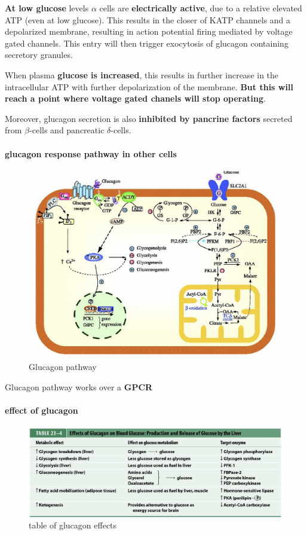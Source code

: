 \documentclass[../main.tex]{subfiles}
\begin{document}
\textbf{At low glucose} levels $\alpha$ cells are \textbf{electrically active}, due to a relative elevated ATP (even at low glucose). This results in the closer of KATP channels and a depolarized membrane, resulting in action potential firing mediated by voltage gated channels. This entry will then trigger exocytosis of glucagon containing secretory granules.

When plasma \textbf{glucose is increased}, this results in further increase in the intracellular ATP with further depolarization of the membrane. \textbf{But this will reach a point where voltage gated chanels will stop operating}. 

\indent Moreover, glucagon secretion is also \textbf{inhibited by pancrine factors} secreted from $\beta$-cells and pancreatic $\delta$-cells. 

\paragraph{glucagon response pathway in other cells}
\begin{figure}[H]
    \centering
    \includegraphics[width=0.5\linewidth]{GlucagonPathway.png}
    \caption{Glucagon pathway}
    \label{fig:enter-label}
\end{figure}
Glucagon pathway works over a \textbf{GPCR}

\paragraph{effect of glucagon}
\begin{figure}[H]
    \centering
    \includegraphics[width=1\linewidth]{glucagonTable.png}
    \caption{table of glucagon effects}
    \label{fig:enter-label}
\end{figure}
\end{document}
